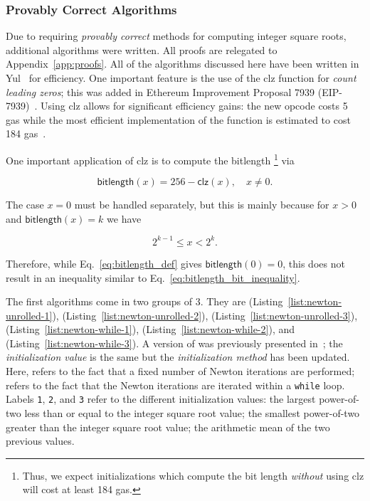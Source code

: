 






\subsubsection{Provably Correct Algorithms}

Due to requiring \emph{provably correct}
methods for computing integer square roots,
additional algorithms were written.
All proofs are relegated to Appendix~\ref{app:proofs}.
All of the algorithms discussed here have been written in
Yul~\cite{YulLanguage} for efficiency.
One important feature is the use of the \textsf{clz} function
for \emph{count leading zeros};
this was added in Ethereum Improvement Proposal 7939
(EIP-7939)~\cite{eip7939}.
Using \textsf{clz} allows for significant efficiency gains:
the new opcode costs 5 gas while the most efficient implementation
of the function is estimated to cost 184 gas~\cite[Specification]{eip7939}.

One important application of \textsf{clz} is to compute the bitlength%
\footnote{Thus, we expect initializations which compute the bit length
\emph{without} using \textsf{clz} will cost at least 184 gas.}
via

\begin{equation}
    \textsf{bitlength}(x) = 256 - \textsf{clz}(x), \quad x\ne 0.
    \label{eq:bitlength_def}
\end{equation}

\noindent
The case $x=0$ must be handled separately,
but this is mainly because for $x>0$ and $\textsf{bitlength}(x) = k$
we have

\begin{equation}
    2^{k-1} \le x < 2^{k}.
    \label{eq:bitlength_bit_inequality}
\end{equation}

\noindent
Therefore, while Eq.~\eqref{eq:bitlength_def} gives $\textsf{bitlength}(0) = 0$,
this does not result in an inequality similar to
Eq.~\eqref{eq:bitlength_bit_inequality}.

The first algorithms come in two groups of 3.
They are
\UnrolledOne{} (Listing~\ref{list:newton-unrolled-1}),
\UnrolledTwo{} (Listing~\ref{list:newton-unrolled-2}),
\UnrolledThree{} (Listing~\ref{list:newton-unrolled-3}),
\WhileOne{} (Listing~\ref{list:newton-while-1}),
\WhileTwo{} (Listing~\ref{list:newton-while-2}), and
\WhileThree{} (Listing~\ref{list:newton-while-3}).
A version of \UnrolledThree{} was previously presented
in~\cite{EfficientIsqrt};
the \emph{initialization value} is the same but
the \emph{initialization method} has been updated.
Here, \unrolled{} refers to the fact that a fixed number of Newton iterations
are performed;
\while{} refers to the fact that the Newton iterations are iterated
within a \texttt{while} loop.
Labels \texttt{1}, \texttt{2}, and \texttt{3}
refer to the different initialization values:
the largest power-of-two less than or equal to the integer square root value;
the smallest power-of-two greater than the integer square root value;
the arithmetic mean of the two previous values.

